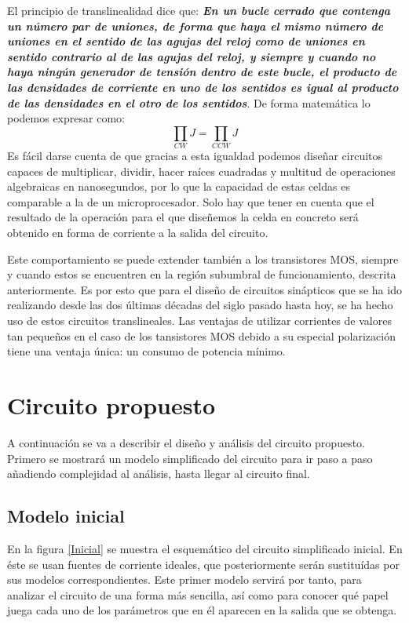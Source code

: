 El principio de translinealidad dice que: {\bf{\it En un bucle cerrado que contenga un número par de uniones, de forma que haya el mismo número de uniones en el sentido de las agujas del reloj como de uniones en sentido contrario al de las agujas del reloj, y siempre y cuando no haya ningún generador de tensión dentro de este bucle, el producto de las densidades de corriente en uno de los sentidos es igual al producto de las densidades en el otro de los sentidos}}. De forma matemática lo podemos expresar como: $$\prod_{CW}J=\prod_{CCW}J$$ Es fácil darse cuenta de que gracias a esta igualdad podemos diseñar circuitos capaces de multiplicar, dividir, hacer raíces cuadradas y multitud de operaciones algebraicas en nanosegundos, por lo que la capacidad de estas celdas es comparable a la de un microprocesador. Solo hay que tener en cuenta que el resultado de la operación para el que diseñemos la celda en concreto será obtenido en forma de corriente a la salida del circuito.

Este comportamiento se puede extender también a los transistores MOS, siempre y cuando estos se encuentren en la región subumbral de funcionamiento, descrita anteriormente. Es por esto que para el diseño de circuitos sinápticos que se ha ido realizando desde las dos últimas décadas del siglo pasado hasta hoy, se ha hecho uso de estos circuitos translineales. Las ventajas de utilizar corrientes de valores tan pequeños en el caso de los tansistores MOS debido a su especial polarización tiene una ventaja única: un consumo de potencia mínimo.

\section{Circuito propuesto}

A continuación se va a describir el diseño y análisis del circuito propuesto. Primero se mostrará un modelo simplificado del circuito para ir paso a paso añadiendo complejidad al análisis, hasta llegar al circuito final.

\subsection{Modelo inicial}

En la figura \ref{Inicial} se muestra el esquemático del circuito simplificado inicial. En éste se usan fuentes de corriente ideales, que posteriormente serán sustituídas por sus modelos correspondientes. Este primer modelo servirá por tanto, para analizar el circuito de una forma más sencilla, así como para conocer qué papel juega cada uno de los parámetros que en él aparecen en la salida que se obtenga.

